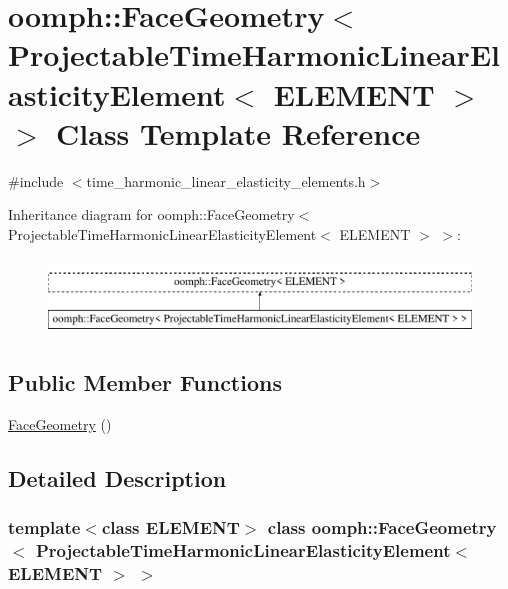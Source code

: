 \hypertarget{classoomph_1_1FaceGeometry_3_01ProjectableTimeHarmonicLinearElasticityElement_3_01ELEMENT_01_4_01_4}{}\section{oomph\+:\+:Face\+Geometry$<$ Projectable\+Time\+Harmonic\+Linear\+Elasticity\+Element$<$ E\+L\+E\+M\+E\+NT $>$ $>$ Class Template Reference}
\label{classoomph_1_1FaceGeometry_3_01ProjectableTimeHarmonicLinearElasticityElement_3_01ELEMENT_01_4_01_4}


{\ttfamily \#include $<$time\+\_\+harmonic\+\_\+linear\+\_\+elasticity\+\_\+elements.\+h$>$}

Inheritance diagram for oomph\+:\+:Face\+Geometry$<$ Projectable\+Time\+Harmonic\+Linear\+Elasticity\+Element$<$ E\+L\+E\+M\+E\+NT $>$ $>$\+:\begin{figure}[H]
\begin{center}
\leavevmode
\includegraphics[height=2.000000cm]{classoomph_1_1FaceGeometry_3_01ProjectableTimeHarmonicLinearElasticityElement_3_01ELEMENT_01_4_01_4}
\end{center}
\end{figure}
\subsection*{Public Member Functions}
\begin{DoxyCompactItemize}
\item 
\hyperlink{classoomph_1_1FaceGeometry_3_01ProjectableTimeHarmonicLinearElasticityElement_3_01ELEMENT_01_4_01_4_a3ba6d3147867d1d008e33355569d1b21}{Face\+Geometry} ()
\end{DoxyCompactItemize}


\subsection{Detailed Description}
\subsubsection*{template$<$class E\+L\+E\+M\+E\+NT$>$\newline
class oomph\+::\+Face\+Geometry$<$ Projectable\+Time\+Harmonic\+Linear\+Elasticity\+Element$<$ E\+L\+E\+M\+E\+N\+T $>$ $>$}

